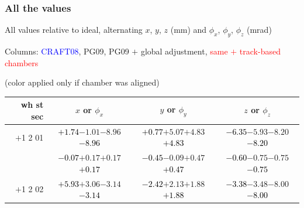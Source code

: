 \documentclass[compress]{beamer}
\begin{document}
\begin{frame}
\frametitle{All the values}
\tiny

All values relative to ideal, alternating $x$, $y$, $z$ (mm) and $\phi_x$, $\phi_y$, $\phi_z$ (mrad)

Columns: \textcolor{blue}{CRAFT08}, PG09, PG09 $+$ global adjustment, \textcolor{red}{same $+$ track-based chambers}

\hfill (color applied only if chamber was aligned)

\vfill
\renewcommand{\arraystretch}{1.1}
\begin{tabular}{r | c | c | c}
wh st sec & $x$ or $\phi_x$ & $y$ or $\phi_y$ & $z$ or $\phi_z$ \\\hline
$+$1 2 01 & \textcolor{black}{$+1.74$}\hspace{0.1 cm}$-1.01$\hspace{0.1 cm}$-8.96$\hspace{0.1 cm}\textcolor{black}{$-8.96$} & \textcolor{black}{$+0.77$}\hspace{0.1 cm}$+5.07$\hspace{0.1 cm}$+4.83$\hspace{0.1 cm}\textcolor{black}{$+4.83$} & \textcolor{black}{$-6.35$}\hspace{0.1 cm}$-5.93$\hspace{0.1 cm}$-8.20$\hspace{0.1 cm}\textcolor{black}{$-8.20$} \\
          & \textcolor{black}{$-0.07$}\hspace{0.1 cm}$+0.17$\hspace{0.1 cm}$+0.17$\hspace{0.1 cm}\textcolor{black}{$+0.17$} & \textcolor{black}{$-0.45$}\hspace{0.1 cm}$-0.09$\hspace{0.1 cm}$+0.47$\hspace{0.1 cm}\textcolor{black}{$+0.47$} & \textcolor{black}{$-0.60$}\hspace{0.1 cm}$-0.75$\hspace{0.1 cm}$-0.75$\hspace{0.1 cm}\textcolor{black}{$-0.75$} \\
$+$1 2 02 & \textcolor{black}{$+5.93$}\hspace{0.1 cm}$+3.06$\hspace{0.1 cm}$-3.14$\hspace{0.1 cm}\textcolor{black}{$-3.14$} & \textcolor{black}{$-2.42$}\hspace{0.1 cm}$+2.13$\hspace{0.1 cm}$+1.88$\hspace{0.1 cm}\textcolor{black}{$+1.88$} & \textcolor{black}{$-3.38$}\hspace{0.1 cm}$-3.48$\hspace{0.1 cm}$-8.00$\hspace{0.1 cm}\textcolor{black}{$-8.00$} \\

\end{tabular}
\end{frame}
\end{document}
